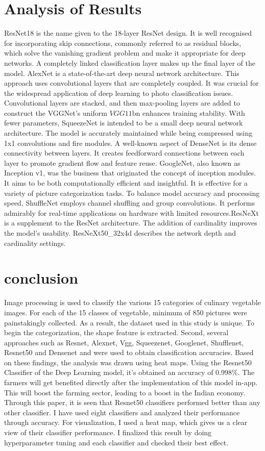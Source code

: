 \documentclass[a4paper,fleqn]{cas-sc}
\begin{document}
\section{Analysis of Results}
ResNet18 is the name given to the 18-layer ResNet design. It is well recognised for incorporating skip connections, commonly referred to as residual blocks, which solve the vanishing gradient problem and make it appropriate for deep networks. A completely linked classification layer makes up the final layer of the model. AlexNet is a state-of-the-art deep neural network architecture. This approach uses convolutional layers that are completely coupled. It was crucial for the widespread application of deep learning to photo classification issues. Convolutional layers are stacked, and then max-pooling layers are added to construct the VGGNet's uniform $ VGG11$bn enhances training stability. With fewer parameters, SqueezeNet is intended to be a small deep neural network architecture. The model is accurately maintained while being compressed using 1x1 convolutions and fire modules. A well-known aspect of DenseNet is its dense connectivity between layers. It creates feedforward connections between each layer to promote gradient flow and feature reuse. GoogleNet, also known as Inception v1, was the business that originated the concept of inception modules. It aims to be both computationally efficient and insightful. It is effective for a variety of picture categorization tasks. To balance model accuracy and processing speed, ShuffleNet employs channel shuffling and group convolutions. It performs admirably for real-time applications on hardware with limited resources.ResNeXt is a supplement to the ResNet architecture. The addition of cardinality improves the model's usability. ResNeXt50\_32x4d describes the network depth and cardinality settings.





\section{conclusion}
Image processing is used to classify the various 15 categories of culinary vegetable images. For each of the 15 classes of vegetable, minimum of 850 pictures were painstakingly collected. As a result, the dataset used in this study is unique. To begin the categorization, the shape feature is extracted. Second, several approaches such as Resnet, Alexnet, Vgg, Squeezenet, Googlenet, Shufflenet, Resnet50 and Densenet and were used to obtain classification accuracies. Based on these findings, the analysis was drawn using heat maps. Using the Resnet50 Classifier of the Deep Learning model, it’s obtained an accuracy of 0.998\%. The farmers will get benefited directly after the implementation of this model in-app. This will boost the farming sector, leading to a boost in the Indian economy. Through this paper, it is seen that Resnet50 classifiers performed better than any other classifier. I have used eight classifiers and analyzed their performance through accuracy. For visualization, I used a heat map, which gives us a clear view of their classifier performance. I finalized this result by doing hyperparameter tuning and each classifier and checked their best effect.
\end{document}
